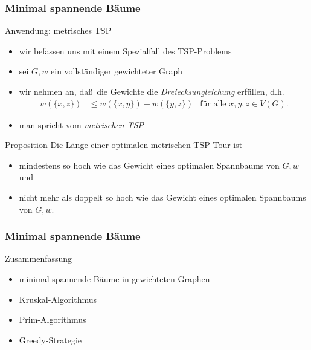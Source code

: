 \documentclass[aspectratio=1610, 11pt]{beamer}
\newcommand{\mytitle}{Minimal spannende B\"aume}
\begin{document}
\begin{frame}\frametitle{\mytitle}
	\begin{overprint}
		\begin{exampleblock}{Anwendung: metrisches TSP}
			\begin{itemize}
\item  wir befassen uns mit einem Spezialfall des TSP-Problems
	\item  sei $G,w$ ein vollst\"andiger gewichteter Graph
	\item wir nehmen an, da\ss\ die Gewichte die {\em Dreiecksungleichung} erf\"ullen, d.h.\
\begin{align*}
	w(\{x,z\})&\leq w(\{x,y\})+w(\{y,z\})&\mbox{f\"ur alle }x,y,z\in V(G).
\end{align*}
\item man spricht vom {\em metrischen TSP}
			\end{itemize}
\end{exampleblock}
		\begin{block}{Proposition}
	Die L\"ange einer optimalen metrischen TSP-Tour ist
	\begin{itemize}
		\item mindestens so hoch wie das Gewicht eines optimalen Spannbaums von $G,w$ und
		\item nicht mehr als doppelt so hoch wie das Gewicht eines optimalen Spannbaums von $G,w$.
	\end{itemize}
\end{block}
	\end{overprint}
\end{frame}

\begin{frame}\frametitle{\mytitle}
	\begin{exampleblock}{Zusammenfassung}
		\begin{itemize}
			\item minimal spannende B\"aume in gewichteten Graphen
			\item Kruskal-Algorithmus
			\item Prim-Algorithmus
			\item Greedy-Strategie
		\end{itemize}
	\end{exampleblock}
\end{frame}
\end{document}
